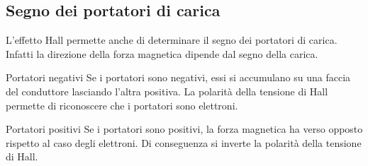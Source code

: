 \documentclass[a4paper]{article}
\begin{document}
\subsection{Segno dei portatori di carica}

L'effetto Hall permette anche di determinare il segno dei portatori di carica. Infatti la direzione della forza magnetica dipende dal segno della carica.

\begin{snippetexample}{Portatori negativi}
    Se i portatori sono negativi, essi si accumulano su una faccia del conduttore lasciando l'altra positiva. La polarità della tensione di Hall permette di riconoscere che i portatori sono elettroni.
\end{snippetexample}

\begin{center}
\end{center}

\begin{snippetexample}{Portatori positivi}
    Se i portatori sono positivi, la forza magnetica ha verso opposto rispetto al caso degli elettroni. Di conseguenza si inverte la polarità della tensione di Hall.
\end{snippetexample}
\end{document}
